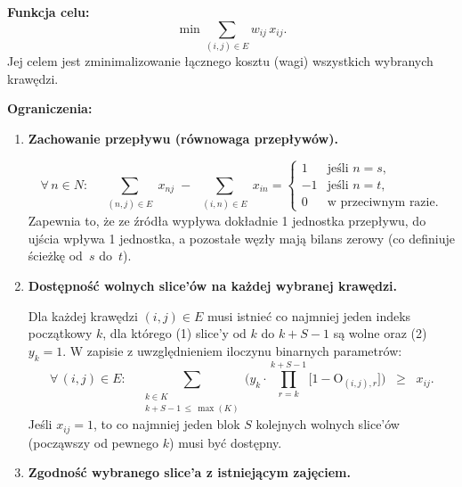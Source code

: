 \documentclass[12pt]{article}
\begin{document}
\vspace{2em}

\noindent \textbf{Funkcja celu:}
\[
	\min \sum_{(i,j)\in E} w_{ij} \, x_{ij}.
\]
Jej celem jest zminimalizowanie łącznego kosztu (wagi) wszystkich wybranych krawędzi.

\vspace{2em}

\noindent \textbf{Ograniczenia:}

\begin{enumerate}
	\item \textbf{Zachowanie przepływu (równowaga przepływów).}

	      \[
		      \forall\, n \in N: \quad
		      \sum_{\substack{(n,j)\in E}} x_{n j}
		      \;-\;
		      \sum_{\substack{(i,n)\in E}} x_{i n}
		      =
		      \begin{cases}
			      1  & \text{jeśli } n = s,       \\
			      -1 & \text{jeśli } n = t,       \\
			      0  & \text{w przeciwnym razie}.
		      \end{cases}
	      \]
	      Zapewnia to, że ze źródła wypływa dokładnie 1 jednostka przepływu, do ujścia wpływa 1 jednostka, a pozostałe węzły mają bilans zerowy (co definiuje ścieżkę od \(\,s\) do \(\,t\)).

	      \vspace{1em}

	\item \textbf{Dostępność wolnych slice'ów na każdej wybranej krawędzi.}

	      Dla każdej krawędzi \((i,j)\in E\) musi istnieć co najmniej jeden indeks początkowy \(k\), dla którego (1) slice'y od \(k\) do \(k+S-1\) są wolne oraz (2) \(y_k=1\). W zapisie z uwzględnieniem iloczynu binarnych parametrów:
	      \[
		      \forall\,(i,j) \in E:\quad
		      \sum_{\substack{k \in K \\ k + S - 1 \,\le\, \max(K)}}
		      \Biggl(
		      y_k \cdot
		      \prod_{r = k}^{k + S - 1} \bigl[1 - \text{O}_{(i,j),r}\bigr]
		      \Biggr)
		      \;\;\ge\;\; x_{ij}.
	      \]
	      Jeśli \(x_{ij} = 1\), to co najmniej jeden blok \(S\) kolejnych wolnych slice'ów (począwszy od pewnego \(k\)) musi być dostępny.


	      \vspace{1em}

	\item \textbf{Zgodność wybranego slice'a z istniejącym zajęciem.}


\end{enumerate}
\end{document}
